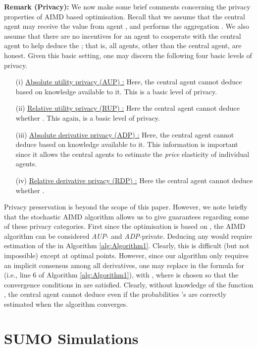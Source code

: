 \documentclass[journal]{IEEEtran}
\begin{document}
\noindent \textbf{Remark (Privacy):} We now make some brief comments concerning the privacy properties of AIMD based optimisation. Recall that we assume that the central agent may receive the value  from agent , and performs the aggregation . We also assume that there are no incentives for an agent to cooperate with the central agent to help deduce the ; that is, all agents, other than the central agent, are honest.  Given this basic setting, one may discern the following four basic levels of privacy.
\begin{itemize}
	\item[(i)] \underline{Absolute utility privacy (AUP) :} Here, the central agent cannot deduce  based on knowledge available to it. This is a basic level of privacy.
	\item[(ii)] \underline{Relative utility privacy (RUP) :} Here the central agent cannot deduce whether  . This again, is a basic level of privacy. 
	\item[(iii)] \underline{Absolute derivative privacy (ADP) :} Here, the central agent cannot deduce  based on knowledge available to it. This information is important since it allows the central agents to estimate the {\em price} elasticity of individual agents.
	\item[(iv)] \underline{Relative derivative privacy (RDP) :} Here the central agent cannot deduce whether  .
\end{itemize}
Privacy preservation is beyond the scope of this paper. However, we note briefly that the stochastic AIMD algorithm allows us to give  guarantees regarding some of these privacy categories. First since the optimisation is based on , the AIMD algorithm can be considered \emph{AUP}- and \emph{ADP}-private. Deducing any  would require estimation of the  in Algorithm \ref{alg:Algorithm1}. Clearly, this is difficult (but not impossible) except at optimal points. However, since our algorithm only requires an implicit consensus among all derivatives, one may replace in the formula for  (i.e., line 6 of Algorithm \ref{alg:Algorithm1}),  with , where  is chosen so that the convergence conditions in \cite{wirth2014nonhomogeneous} are satisfied. Clearly, without knowledge of the function , the central agent cannot deduce  even if the probabilities 's are correctly estimated when the algorithm converges. 



\section{SUMO Simulations}
\end{document}

